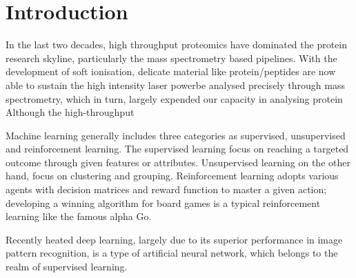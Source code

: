 \section{Introduction}

In the last two decades, high throughput proteomics have dominated the protein research skyline, particularly the mass spectrometry based pipelines. With the development of soft ionisation, delicate material like protein/peptides are now able to sustain the high intensity laser powerbe analysed precisely through mass spectrometry, which in turn, largely expended our capacity in analysing protein Although the high-throughput   
\par 
Machine learning generally includes three categories as supervised, unsupervised and reinforcement learning. The supervised learning focus on reaching a targeted outcome through given features or attributes. Unsupervised learning on the other hand, focus on clustering and grouping. Reinforcement learning adopts various agents with decision matrices and reward function to master a given action; developing a winning algorithm for board games is a typical reinforcement learning like the famous alpha Go.
\par
Recently heated deep learning, largely due to its superior performance in image pattern recognition, is a type of artificial neural network, which belongs to the realm of supervised learning. 
